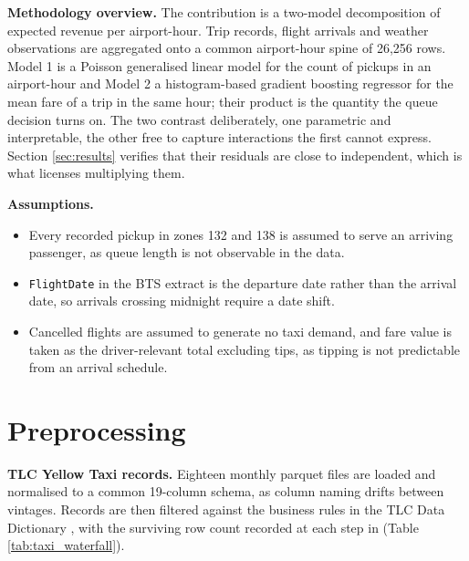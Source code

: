 \documentclass[11pt]{article}
\begin{document}
\textbf{Methodology overview.} The contribution is a two-model decomposition of
expected revenue per airport-hour. Trip records, flight arrivals and weather
observations are aggregated onto a common airport-hour spine of 26,256 rows.
Model 1 is a Poisson generalised linear model for the count of pickups in an
airport-hour and Model 2 a histogram-based gradient boosting regressor for the
mean fare of a trip in the same hour; their product is the quantity the queue
decision turns on. The two contrast deliberately, one parametric and
interpretable, the other free to capture interactions the first cannot express.
Section \ref{sec:results} verifies that their residuals are close to independent,
which is what licenses multiplying them.
 
\textbf{Assumptions.}
\begin{itemize}
  \item Every recorded pickup in zones 132 and 138 is assumed to serve an
        arriving passenger, as queue length is not observable in the data.
  \item \texttt{FlightDate} in the BTS extract is the departure date rather than
        the arrival date, so arrivals crossing midnight require a date shift.
  \item Cancelled flights are assumed to generate no taxi demand, and fare value
        is taken as the driver-relevant total excluding tips, as tipping is not
        predictable from an arrival schedule.
\end{itemize}
 
\section{Preprocessing}
 
\textbf{TLC Yellow Taxi records.} Eighteen monthly parquet files are loaded and
normalised to a common 19-column schema, as column naming drifts between
vintages. Records are then filtered against the business rules in the TLC Data
Dictionary \cite{tlc_dict}, with the surviving row count recorded at each step in
(Table \ref{tab:taxi_waterfall}).
 
\end{document}
